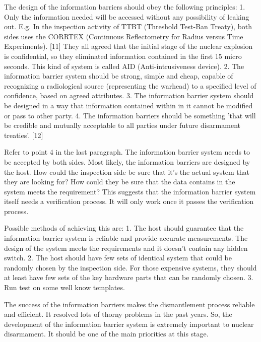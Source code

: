\documentclass[twocolumn,a4paper]{article}
\begin{document}
The design of the information barriers should obey the following principles:
1.	Only the information needed will be accessed without any possibility 
of leaking out. E.g. In the inspection activity of TTBT (Threshold Test-Ban Treaty), 
both sides uses the CORRTEX (Continuous Reflectometry for Radius versus Time 
Experiments). [11] They all agreed that the initial stage of the nuclear explosion
is confidential, so they eliminated information contained in the first 15 micro 
seconds. This kind of system is called AID (Anti-intrusiveness device).
2.	The information barrier system should be strong, simple and cheap,
capable of recognizing a radiological source (representing the warhead) 
to a specified level of confidence, based on agreed attributes. 
3.	The information barrier system should be designed in a way that 
information contained within in it cannot be modified or pass to other party.
4.	The information barriers should be something 'that will be credible
and mutually acceptable to all parties under future disarmament treaties'. [12]

Refer to point 4 in the last paragraph. The information barrier system needs
to be accepted by both sides. Most likely, the information barriers are 
designed by the host. How could the inspection side be sure that it's the
actual system that they are looking for? How could they be sure that the 
data contains in the system meets the requirement? This suggests that the 
information barrier system itself needs a verification process. It will 
only work once it passes the verification process.

Possible methods of achieving this are:
1.	The host should guarantee that the information barrier system 
is reliable and provide accurate measurements. The design of the system
meets the requirements and it doesn't contain any hidden switch.
2.	The host should have few sets of identical system that could
be randomly chosen by the inspection side. For those expensive systems,
they should at least have few sets of the key hardware parts that can be 
randomly chosen.
3.	Run test on some well know templates.

The success of the information barriers makes the dismantlement process 
reliable and efficient. It resolved lots of thorny problems in the past 
years. So, the development of the information barrier system is extremely 
important to nuclear disarmament. It should be one of the main priorities 
at this stage.
\end{document}

